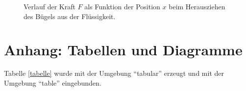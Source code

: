 \documentclass[11pt,a4paper]{article}
\begin{document}
\begin{figure}[p]
\centering
{}
\caption{Verlauf der Kraft $F$ als Funktion der Position $x$ beim Herausziehen des B\"ugels aus der Fl\"ussigkeit.}
\label{abbildung}
\end{figure}


\section{Anhang: Tabellen und Diagramme}

Tabelle \ref{tabelle} wurde mit der Umgebung "`tabular"' erzeugt
und mit der Umgebung "`table"' eingebunden.  



\end{document}
